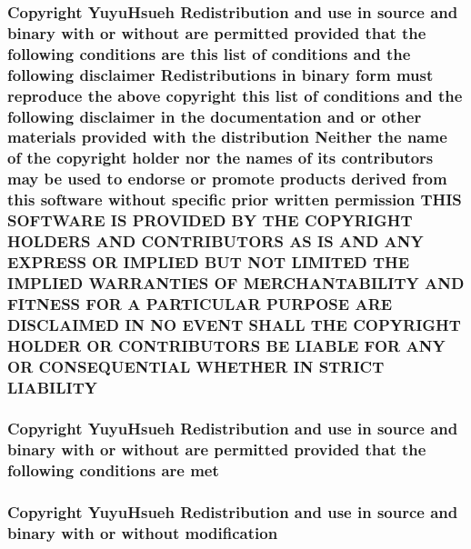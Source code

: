 \subsubsection[{\texorpdfstring{L\+I\+A\+B\+I\+L\+I\+TY}{LIABILITY}}]{\setlength{\rightskip}{0pt plus 5cm}Copyright Yuyu\+Hsueh Redistribution and use in source and binary with or without are permitted provided that the following conditions are this list of conditions and the following disclaimer Redistributions in binary form must reproduce the above copyright this list of conditions and the following disclaimer in the documentation and or other materials provided with the distribution Neither the name of the copyright holder nor the names of its contributors may be used to endorse or promote products derived from this software without specific prior written permission T\+H\+IS S\+O\+F\+T\+W\+A\+RE IS P\+R\+O\+V\+I\+D\+ED BY T\+HE C\+O\+P\+Y\+R\+I\+G\+HT H\+O\+L\+D\+E\+RS A\+ND C\+O\+N\+T\+R\+I\+B\+U\+T\+O\+RS AS IS A\+ND A\+NY E\+X\+P\+R\+E\+SS OR I\+M\+P\+L\+I\+ED B\+UT N\+OT L\+I\+M\+I\+T\+ED T\+HE I\+M\+P\+L\+I\+ED {\bf W\+A\+R\+R\+A\+N\+T\+I\+ES} OF M\+E\+R\+C\+H\+A\+N\+T\+A\+B\+I\+L\+I\+TY A\+ND F\+I\+T\+N\+E\+SS F\+OR A P\+A\+R\+T\+I\+C\+U\+L\+AR P\+U\+R\+P\+O\+SE A\+RE D\+I\+S\+C\+L\+A\+I\+M\+ED IN NO E\+V\+E\+NT S\+H\+A\+LL T\+HE C\+O\+P\+Y\+R\+I\+G\+HT H\+O\+L\+D\+ER OR C\+O\+N\+T\+R\+I\+B\+U\+T\+O\+RS BE L\+I\+A\+B\+LE F\+OR A\+NY OR C\+O\+N\+S\+E\+Q\+U\+E\+N\+T\+I\+AL W\+H\+E\+T\+H\+ER IN S\+T\+R\+I\+CT L\+I\+A\+B\+I\+L\+I\+TY}\hypertarget{license_8txt_a293cddb201641aed1186322968630e55}{}\label{license_8txt_a293cddb201641aed1186322968630e55}
\subsubsection[{\texorpdfstring{met}{met}}]{\setlength{\rightskip}{0pt plus 5cm}Copyright Yuyu\+Hsueh Redistribution and use in source and binary with or without are permitted provided that the following conditions are met}\hypertarget{license_8txt_ac8582a50364a60dd4d7d7d24f725c413}{}\label{license_8txt_ac8582a50364a60dd4d7d7d24f725c413}
\subsubsection[{\texorpdfstring{modification}{modification}}]{\setlength{\rightskip}{0pt plus 5cm}Copyright Yuyu\+Hsueh Redistribution and use in source and binary with or without modification}\hypertarget{license_8txt_ad26192e5b2b1fdec8883d2c0110e35c6}{}\label{license_8txt_ad26192e5b2b1fdec8883d2c0110e35c6}
